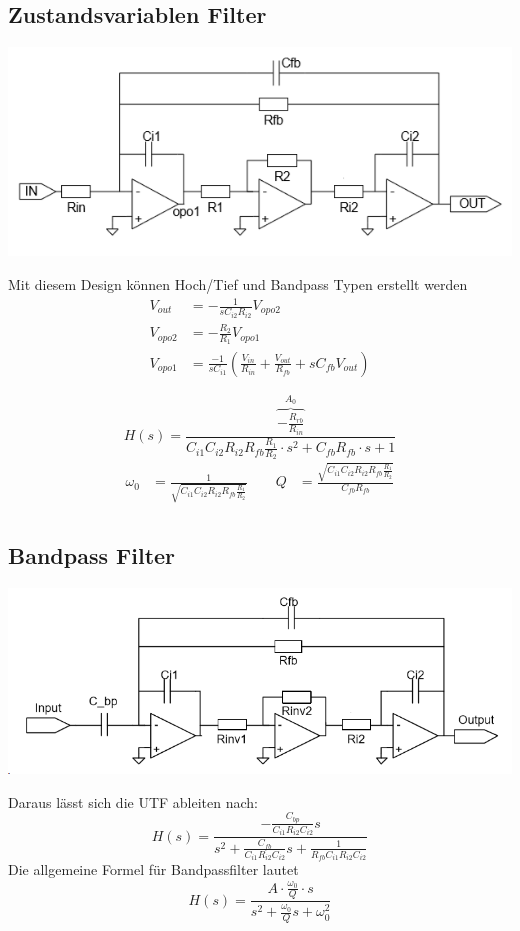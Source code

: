 \subsection{Zustandsvariablen Filter}
\begin{center}
	\includegraphics[width=0.7\columnwidth]{Images/zustandsvariablen_filter}
\end{center}
Mit diesem Design können Hoch/Tief und Bandpass Typen erstellt werden
\begin{align*}
	V_{out} &= -\frac{1}{sC_{i2}R_{i2}}V_{opo2} \\
	V_{opo2} &= -\frac{R_2}{R_1}V_{opo1} \\
	V_{opo1} &= \frac{-1}{sC_{i1}}\left(\frac{V_{in}}{R_{in}} + \frac{V_{out}}{R_{fb}} + sC_{fb}V_{out}\right)
\end{align*}

\[
H(s) = \frac{\overbrace{-\frac{R_{rb}}{R_{in}}}^{A_0}}{C_{i1}C_{i2}R_{i2}R_{fb}\frac{R_1}{R_2}\cdot s^2 + C_{fb}R_{fb}\cdot s + 1}
\]
\begin{align*}
	\omega_0 &= \frac{1}{\sqrt{C_{i1}C_{i2}R_{i2}R_{fb}\frac{R_1}{R_2}}} \qquad 
	Q &= \frac{\sqrt{C_{i1}C_{i2}R_{i2}R_{fb}\frac{R_1}{R_2}}}{C_{fb}R_{fb} } \\
\end{align*}


\subsection{Bandpass Filter}
\begin{center}
	\includegraphics[width=0.6\columnwidth]{Images/bandpass}
\end{center}
Daraus lässt sich die UTF ableiten nach:
\[
H(s) = \frac{-\frac{C_{bp}}{C_{i1}R_{i2}C_{i2}}s}{s^2 + \frac{C_{fb}}{C_{i1}R_{i2}C_{i2}}s + \frac{1}{R_{fb} C_{i1}R_{i2}C_{i2}}}
\]
Die allgemeine Formel für Bandpassfilter lautet
\[
H(s) = \frac{A\cdot\frac{\omega_0}{Q}\cdot s}{s^2 + \frac{ \omega_0}{Q}s + \omega_0^2}
\]

